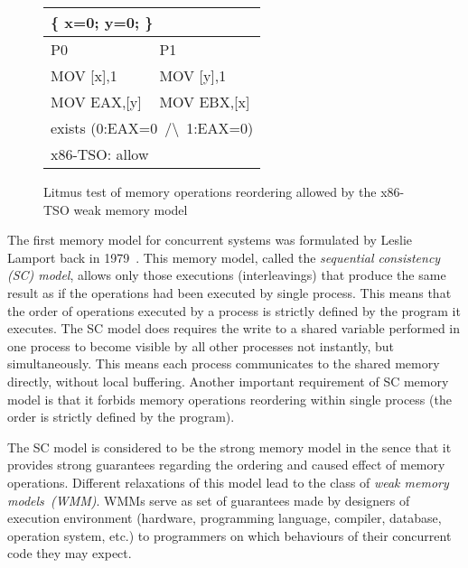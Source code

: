 \begin{figure}
\small \ttfamily
\begin{tabular}{ |l|l| }
\hline
\multicolumn{2}{|l|}{ \{ x=0; y=0; \}} \tabularnewline \hline
P0 & P1 \\ \hline
MOV [x],1 & MOV [y],1 \\
MOV EAX,[y] & MOV EBX,[x] \\
\hline
\multicolumn{2}{|l|}{exists (0:EAX=0~/\textbackslash~1:EAX=0)} \tabularnewline
\hline
\multicolumn{2}{|l|}{x86-TSO: allow} \tabularnewline
\hline

\end{tabular}
\caption{Litmus test of memory operations reordering allowed by the x86-TSO weak memory model}
\label{example:simple_wmm}
\end{figure}

The first memory model for concurrent systems was formulated by Leslie Lamport back in 1979~\cite{lamport1979make}. This memory model, called the \textit{sequential consistency (SC) model}, allows only those executions (interleavings) that produce the same result as if the operations had been executed by single process. This means that the order of operations executed by a process is strictly defined by the program it executes. The SC model does requires the write to a shared variable performed in one process to become visible by all other processes not instantly, but simultaneously. This means each process communicates to the shared memory directly, without local buffering. Another important requirement of SC memory model is that it forbids memory operations reordering within single process (the order is strictly defined by the program).

The SC model is considered to be the strong memory model in the sence that it provides strong guarantees regarding the ordering and caused effect of memory operations. Different relaxations of this model lead to the class of \textit{weak memory models~(WMM)}.
WMMs serve as set of guarantees made by designers of execution environment (hardware, programming language, compiler, database, operation system, etc.) to programmers on which behaviours of their concurrent code they may expect. 

